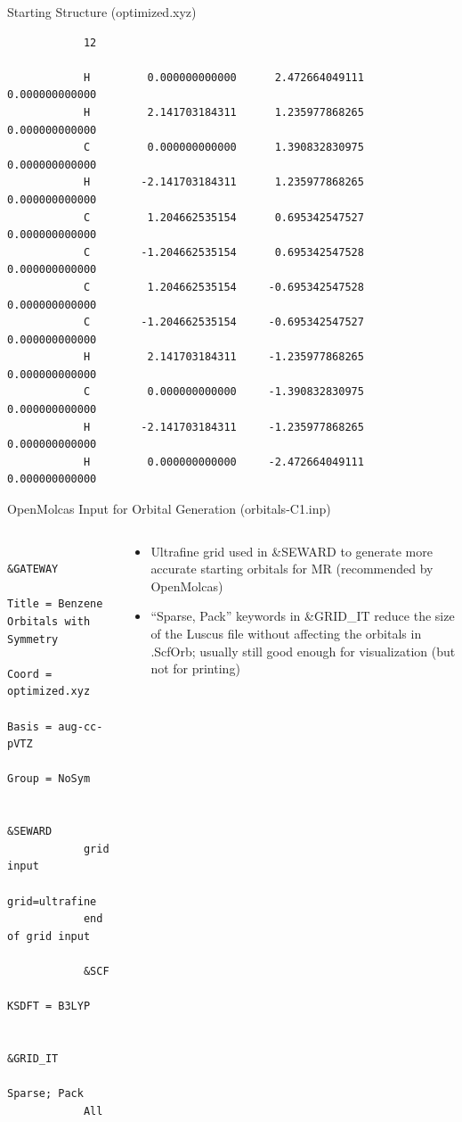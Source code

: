 \documentclass[12pt,aspectratio=169]{beamer}
\begin{document}
	\begin{frame}[fragile]{Starting Structure (optimized.xyz)}
		\begin{footnotesize}
			\begin{verbatim}
			12
			
			H         0.000000000000      2.472664049111      0.000000000000
			H         2.141703184311      1.235977868265      0.000000000000
			C         0.000000000000      1.390832830975      0.000000000000
			H        -2.141703184311      1.235977868265      0.000000000000
			C         1.204662535154      0.695342547527      0.000000000000
			C        -1.204662535154      0.695342547528      0.000000000000
			C         1.204662535154     -0.695342547528      0.000000000000
			C        -1.204662535154     -0.695342547527      0.000000000000
			H         2.141703184311     -1.235977868265      0.000000000000
			C         0.000000000000     -1.390832830975      0.000000000000
			H        -2.141703184311     -1.235977868265      0.000000000000
			H         0.000000000000     -2.472664049111      0.000000000000
		\end{verbatim}
		\end{footnotesize}
	\end{frame}

	\begin{frame}[fragile]{OpenMolcas Input for Orbital Generation (orbitals-C1.inp)}
		\begin{columns}
			\begin{column}{.5\linewidth}
				\begin{scriptsize}
			\begin{verbatim}
			&GATEWAY
			Title = Benzene Orbitals with Symmetry
			Coord = optimized.xyz
			Basis = aug-cc-pVTZ
			Group = NoSym
			
			&SEWARD
			grid input
			grid=ultrafine
			end of grid input
			
			&SCF
			KSDFT = B3LYP
			
			&GRID_IT
			Sparse; Pack
			All
		\end{verbatim}
		\end{scriptsize}
			\end{column}
			\begin{column}{.5\linewidth}
				\begin{itemize}
					\item Ultrafine grid used in \&SEWARD to generate more accurate starting orbitals for MR (recommended by OpenMolcas)
					\item ``Sparse, Pack'' keywords in \&GRID\_IT reduce the size of the Luscus file without affecting the orbitals in .ScfOrb; usually still good enough for visualization (but not for printing)
				\end{itemize}
			\end{column}
		\end{columns}
	\end{frame}
\end{document}
